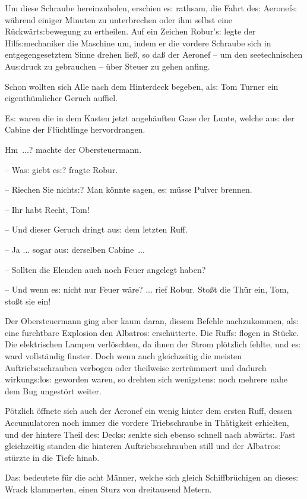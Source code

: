 \documentclass[oneside,12pt]{book}
\newcommand{\s}{s:}
\begin{document}
Um diese Schraube hereinzuholen, erschien e{\s} rathsam, die Fahrt
de{\s} Aeronef{\s} w\"ahrend einiger Minuten zu unterbrechen oder ihm
selbst eine R\"uckw\"art{\s}bewegung zu ertheilen. Auf ein Zeichen
Robur'{\s} legte der Hilf{\s}mechaniker die Maschine um, indem er die
vordere Schraube sich in entgegengesetztem Sinne drehen lie{\ss}, so
da{\ss} der Aeronef -- um den seetechnischen Au{\s}druck zu
gebrauchen -- {\glqq}\"uber Steuer zu gehen{\grqq} anfing.

Schon wollten sich Alle nach dem Hinterdeck begeben, al{\s} Tom
Turner ein eigenth\"umlicher Geruch auf\/fiel.

E{\s} waren die in dem Kasten jetzt angeh\"auften Gase der Lunte,
welche au{\s} der Cabine der Fl\"uchtlinge hervordrangen.

{\glqq}Hm~...? machte der Obersteuermann.

-- Wa{\s} giebt e{\s}? fragte Robur.

-- Riechen Sie nicht{\s}? Man k\"onnte sagen, e{\s} m\"usse Pulver
brennen.

-- Ihr habt Recht, Tom!

-- Und dieser Geruch dringt au{\s} dem letzten Ruff.

-- Ja ... sogar au{\s} derselben Cabine~...

-- Sollten die Elenden auch noch Feuer angelegt haben?

-- Und wenn e{\s} nicht nur Feuer w\"are? ... rief Robur. Sto{\ss}t
die Th\"ur ein, Tom, sto{\ss}t sie ein!{\grqq}

Der Obersteuermann ging aber kaum daran, diesem Befehle nachzukommen,
al{\s} eine furchtbare Explosion den {\glqq}Albatro{\s}{\grqq}
ersch\"utterte. Die Ruff{\s} flogen in St\"ucke. Die elektrischen
Lampen verl\"oschten, da ihnen der Strom pl\"otzlich fehlte, und
e{\s} ward vollst\"andig finster. Doch wenn auch gleichzeitig die
meisten Auftrieb{\s}schrauben verbogen oder theilweise zertr\"ummert
und dadurch wirkung{\s}lo{\s} geworden waren, so drehten sich
wenigsten{\s} noch mehrere nahe dem Bug ungest\"ort weiter.

P\"otzlich \"offnete sich auch der Aeronef ein wenig hinter dem
ersten Ruff, dessen Accumulatoren noch immer die vordere
Triebschraube in Th\"atigkeit erhielten, und der hintere Theil de{\s}
Deck{\s} senkte sich ebenso schnell nach abw\"art{\s}. Fast
gleichzeitig standen die hinteren Auftrieb{\s}schrauben still und der
{\glqq}Albatro{\s}{\grqq} st\"urzte in die Tiefe hinab.

Da{\s} bedeutete f\"ur die acht M\"anner, welche sich gleich
Schiffbr\"uchigen an diese{\s} Wrack klammerten, einen Sturz von
dreitausend Metern.
\end{document}
